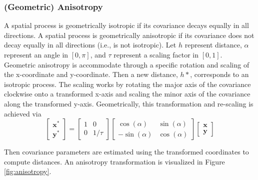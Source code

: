 \documentclass{article}
\begin{document}
\hypertarget{geometric-anisotropy}{%
\subsubsection{(Geometric) Anisotropy}\label{geometric-anisotropy}}

A spatial process is geometrically isotropic if its covariance decays
equally in all directions. A spatial process is geometrically
anisotropic if its covariance does not decay equally in all directions
(i.e., is not isotropic). Let \(h\) represent distance, \(\alpha\)
represent an angle in \([0, \pi]\), and \(\tau\) represent a scaling
factor in \([0, 1]\). Geometric anisotropy is accommodate through a
specific rotation and scaling of the x-coordinate and y-coordinate. Then
a new distance, \(h*\), corresponds to an isotropic process. The scaling
works by rotating the major axis of the covariance clockwise onto a
transformed x-axis and scaling the minor axis of the covariance along
the transformed y-axis. Geometrically, this transformation and
re-scaling is achieved via \begin{equation}
  \begin{bmatrix}
    \mathbf{x}^* \\
    \mathbf{y}^*
  \end{bmatrix} = 
  \begin{bmatrix}
    1 & 0 \\
    0 & 1 / \tau
  \end{bmatrix}
  \begin{bmatrix}
    \cos(\alpha) & \sin(\alpha) \\
    -\sin(\alpha) & \cos(\alpha)
  \end{bmatrix}  
  \begin{bmatrix}
    \mathbf{x} \\
    \mathbf{y}
  \end{bmatrix}
\end{equation}

Then covariance parameters are estimated using the transformed
coordinates to compute distances. An anisotropy transformation is
visualized in Figure\(~\)\ref{fig:anisotropy}.
\end{document}
